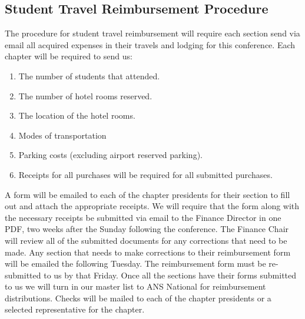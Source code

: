 \subsection{Student Travel Reimbursement Procedure}
The procedure for student travel reimbursement will require each section send via email all acquired expenses in their travels and lodging for this conference. Each chapter will be required to send us:
\begin{enumerate}
    \item The number of students that attended.
    \item The number of hotel rooms reserved.
    \item The location of the hotel rooms.
    \item Modes of transportation
    \item Parking costs (excluding airport reserved parking).
    \item Receipts for all purchases will be required for all submitted purchases.
\end{enumerate}
A form will be emailed to each of the chapter presidents for their section to fill out and attach the appropriate receipts. We will require that the form along with the necessary receipts be submitted via email to the Finance Director in one PDF, two weeks after the Sunday following the conference. The Finance Chair will review all of the submitted documents for any corrections that need to be made. Any section that needs to make corrections to their reimbursement form will be emailed the following Tuesday. The reimbursement form must be re-submitted to us by that Friday. Once all the sections have their forms submitted to us we will turn in our master list to ANS National for reimbursement distributions. Checks will be mailed to each of the chapter presidents or a selected representative for the chapter.
